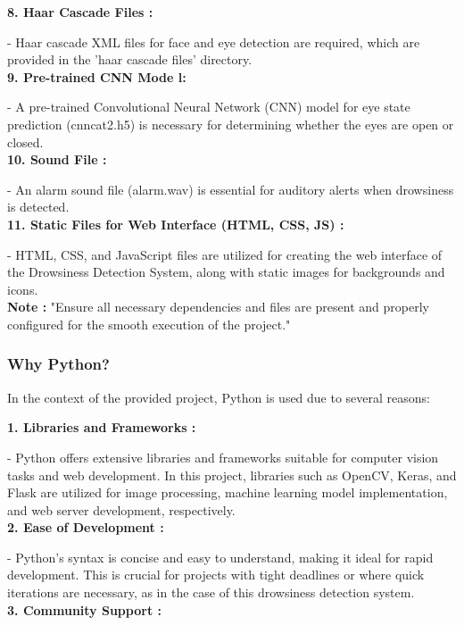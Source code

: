 \documentclass[12pt]{article}
\begin{document}
\textbf{8. Haar Cascade Files : }

- Haar cascade XML files for face and eye detection are required, which are provided in the 'haar cascade files' directory.\\

\textbf{9. Pre-trained CNN Mode l:} 

- A pre-trained Convolutional Neural Network (CNN) model for eye state prediction (cnncat2.h5) is necessary for determining whether the eyes are open or closed.\\

\textbf{10. Sound File : }

- An alarm sound file (alarm.wav) is essential for auditory alerts when drowsiness is detected.\\

\textbf{11. Static Files for Web Interface (HTML, CSS, JS) :} 

- HTML, CSS, and JavaScript files are utilized for creating the web interface of the Drowsiness Detection System, along with static images for backgrounds and icons.\\

\textbf{Note :} "Ensure all necessary dependencies and files are present and properly configured for the smooth execution of the project."

\subsubsection{Why Python?}
In the context of the provided project, Python is used due to several reasons:

\textbf{1. Libraries and Frameworks : }

- Python offers extensive libraries and frameworks suitable for computer vision tasks and web development. In this project, libraries such as OpenCV, Keras, and Flask are utilized for image processing, machine learning model implementation, and web server development, respectively.\\

\textbf{2. Ease of Development :}

- Python's syntax is concise and easy to understand, making it ideal for rapid development. This is crucial for projects with tight deadlines or where quick iterations are necessary, as in the case of this drowsiness detection system.\\

\textbf{3. Community Support :}
\end{document}
